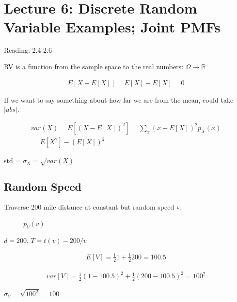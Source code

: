 \documentclass{article}
\begin{document}
\section{Lecture 6: Discrete Random Variable Examples; Joint PMFs}

 Reading: 2.4-2.6

RV is a function from the sample space to the real numbers: $\Omega \rightarrow \mathbb{R}$


\begin{align*}
E[X-E[X]] = E[X] - E[X] = 0
\end{align*}

If we want to say something about how far we are from the mean, could take $|abs|$.

\begin{align*}
var(X)=E[(X-E[X])^2] = \sum_x(x - E[X])^2 p_X(x)\\
= E[X^2] -(E[X])^2
\end{align*}

std = $\sigma_X = \sqrt{var(X)}$

\subsection{Random Speed}


Traverse 200 mile distance at constant but random speed v.


\begin{figure}[h]
\caption{$p_V(v)$}
\end{figure}

$d=200$, $T=t(v)-200/v$

\begin{align*}
E[V] = \frac{1}{2}1 + \frac{1}{2}200 = 100.5
\end{align*}

\begin{align*}
var[V] = \frac{1}{2}(1-100.5)^2 + \frac{1}{2}(200 -100.5)^2 = 100^2
\end{align*}

$\sigma_V = \sqrt{100^2}=100$
\end{document}
